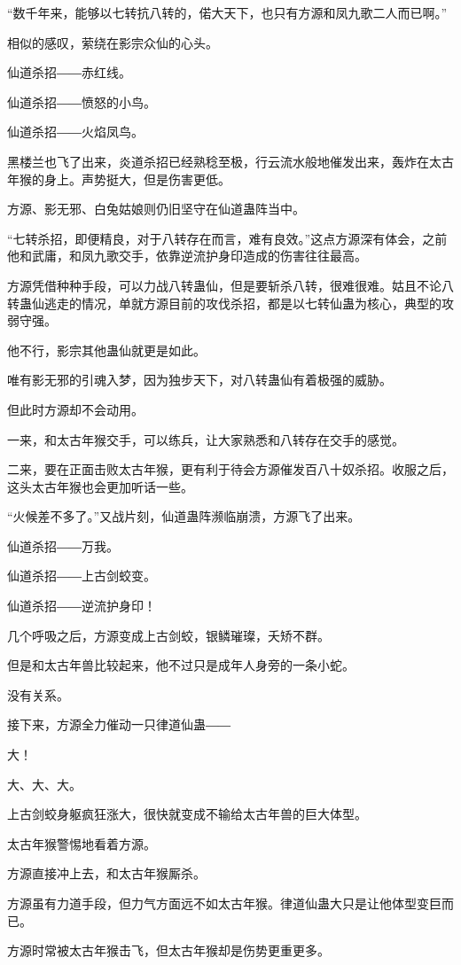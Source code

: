 \begin{this_body}
“数千年来，能够以七转抗八转的，偌大天下，也只有方源和凤九歌二人而已啊。”

相似的感叹，萦绕在影宗众仙的心头。

仙道杀招――赤红线。

仙道杀招――愤怒的小鸟。

仙道杀招――火焰凤鸟。

黑楼兰也飞了出来，炎道杀招已经熟稔至极，行云流水般地催发出来，轰炸在太古年猴的身上。声势挺大，但是伤害更低。

方源、影无邪、白兔姑娘则仍旧坚守在仙道蛊阵当中。

“七转杀招，即便精良，对于八转存在而言，难有良效。”这点方源深有体会，之前他和武庸，和凤九歌交手，依靠逆流护身印造成的伤害往往最高。

方源凭借种种手段，可以力战八转蛊仙，但是要斩杀八转，很难很难。姑且不论八转蛊仙逃走的情况，单就方源目前的攻伐杀招，都是以七转仙蛊为核心，典型的攻弱守强。

他不行，影宗其他蛊仙就更是如此。

唯有影无邪的引魂入梦，因为独步天下，对八转蛊仙有着极强的威胁。

但此时方源却不会动用。

一来，和太古年猴交手，可以练兵，让大家熟悉和八转存在交手的感觉。

二来，要在正面击败太古年猴，更有利于待会方源催发百八十奴杀招。收服之后，这头太古年猴也会更加听话一些。

“火候差不多了。”又战片刻，仙道蛊阵濒临崩溃，方源飞了出来。

仙道杀招――万我。

仙道杀招――上古剑蛟变。

仙道杀招――逆流护身印！

几个呼吸之后，方源变成上古剑蛟，银鳞璀璨，夭矫不群。

但是和太古年兽比较起来，他不过只是成年人身旁的一条小蛇。

没有关系。

接下来，方源全力催动一只律道仙蛊――

大！

大、大、大。

上古剑蛟身躯疯狂涨大，很快就变成不输给太古年兽的巨大体型。

太古年猴警惕地看着方源。

方源直接冲上去，和太古年猴厮杀。

方源虽有力道手段，但力气方面远不如太古年猴。律道仙蛊大只是让他体型变巨而已。

方源时常被太古年猴击飞，但太古年猴却是伤势更重更多。


\end{this_body}

